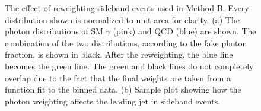 \begin{figure}[p]
 \centering
{}

 \caption{The effect of reweighting sideband events used in Method B. Every distribution shown is normalized to unit area for clarity. (a) The photon \et distributions of SM $\gamma$ (pink) and QCD (blue) are shown. The combination of the two distributions, according to the fake photon fraction, is shown in black. After the reweighting, the blue line becomes the green line. The green and black lines do not completely overlap due to the fact that the final weights are taken from a function fit to the binned data. (b) Sample plot showing how the photon \et weighting affects the leading jet in sideband events.}
\label{fig:MtdB_Rewgt_Demo}
\end{figure}

